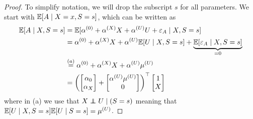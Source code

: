 \documentclass{article}
\begin{document}
\begin{proof}
    To simplify notation, we will drop the subscript $s$ for all parameters. We start with $\mathbb{E}[A\mid X=x, S=s]$, which can be written as
    \begin{equation*}
        \begin{aligned}
            \mathbb{E}[A\mid X, S=s] & = \mathbb{E}[\alpha^{(0)} + \alpha^{(X)} X + \alpha^{(U)} U + \varepsilon_A\mid X, S=s] \\
            &= \alpha^{(0)}  + \alpha^{(X)} X  + \alpha^{(U)} \mathbb{E}[U\mid X, S=s] + \underbrace{\mathbb{E}[\varepsilon_A \mid X, S=s]}_{=0} \\
            & \overset{(a)}{=} \alpha^{(0)}  + \alpha^{(X)} X  + \alpha^{(U)} \mu^{(U)} \\
            & = 
            \left(\begin{bmatrix}
                \alpha_{0}\\ \alpha_{X}
            \end{bmatrix}
            +
            \begin{bmatrix}
                \alpha^{(U)} \mu^{(U)}\\
                0
            \end{bmatrix}\right)^\top \begin{bmatrix}
                1\\ 
                X
                \end{bmatrix}
        \end{aligned}
    \end{equation*}
    where in (a) we use that $X\indep U\mid (S=s)$ meaning that $\mathbb{E}[U\mid X, S=s]\mathbb{E}[U\mid S=s]=\mu^{(U)}$.
    

\end{proof}
\end{document}
